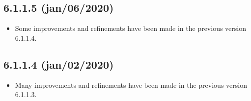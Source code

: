 \subsection*{6.1.1.5 (jan/06/2020)}
\begin{itemize}
  \item Some improvements and refinements have been made in the previous version 6.1.1.4.
\end{itemize}

\subsection*{6.1.1.4 (jan/02/2020)}
\begin{itemize}
  \item Many improvements and refinements have been made in the previous version 6.1.1.3.
\end{itemize}

